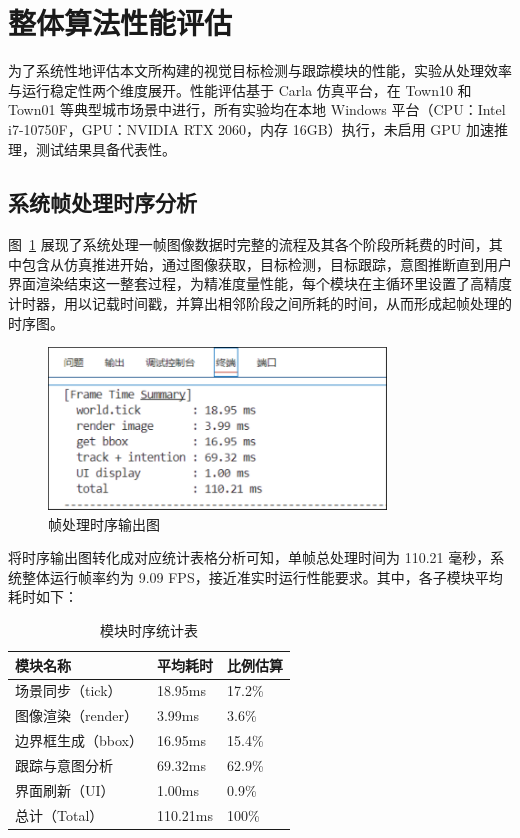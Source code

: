 \section{整体算法性能评估}

为了系统性地评估本文所构建的视觉目标检测与跟踪模块的性能，实验从处理效率与运行稳定性两个维度展开。性能评估基于 Carla 仿真平台，在 Town10 和 Town01 等典型城市场景中进行，所有实验均在本地 Windows 平台（CPU：Intel i7-10750F，GPU：NVIDIA RTX 2060，内存 16GB）执行，未启用 GPU 加速推理，测试结果具备代表性。

\subsection{系统帧处理时序分析}

图~\ref{fig:frame} 展现了系统处理一帧图像数据时完整的流程及其各个阶段所耗费的时间，其中包含从仿真推进开始，通过图像获取，目标检测，目标跟踪，意图推断直到用户界面渲染结束这一整套过程，为精准度量性能，每个模块在主循环里设置了高精度计时器，用以记载时间戳，并算出相邻阶段之间所耗的时间，从而形成起帧处理的时序图。

\begin{figure}[H]
	\centering
	\includegraphics[width=0.8\textwidth]{images/图11 帧处理时序输出图.pdf}  %
	\caption{帧处理时序输出图}
	\label{fig:frame}  %
\end{figure}

将时序输出图转化成对应统计表格分析可知，单帧总处理时间为 110.21 毫秒，系统整体运行帧率约为 9.09 FPS，接近准实时运行性能要求。其中，各子模块平均耗时如下：

\begin{table}[htbp]
	\caption{模块时序统计表}
	\label{tab:timetable}
	\centering
	\begin{tabular}{lll}
		\toprule
		模块名称 & 平均耗时 & 比例估算 \\
		\midrule
		场景同步（tick） & 18.95ms & 17.2\% \\
		图像渲染（render） & 3.99ms & 3.6\% \\
		边界框生成（bbox） & 16.95ms & 15.4\% \\
		跟踪与意图分析 & 69.32ms & 62.9\% \\
		界面刷新（UI） & 1.00ms & 0.9\% \\
		总计（Total） & 110.21ms & 100\% \\
		\bottomrule
	\end{tabular}
\end{table}

